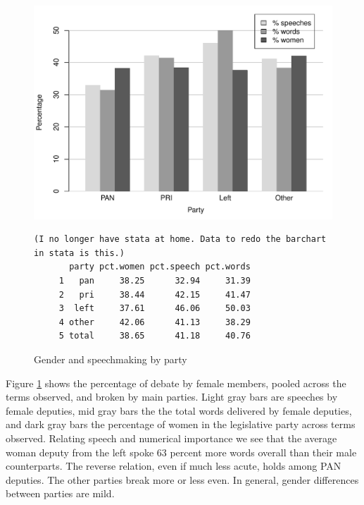 \documentclass[letter,12pt]{article}
\begin{document}
\begin{figure}
  \centering
    \includegraphics[width=.67\columnwidth]{../plots/women-bar.pdf}
\singlespacing
\begin{scriptsize}
\begin{verbatim}
(I no longer have stata at home. Data to redo the barchart in stata is this.)
       party pct.women pct.speech pct.words
     1   pan     38.25      32.94     31.39
     2   pri     38.44      42.15     41.47
     3  left     37.61      46.06     50.03
     4 other     42.06      41.13     38.29
     5 total     38.65      41.18     40.76
\end{verbatim}
\end{scriptsize}
\doublespacing
    \caption{Gender and speechmaking by party}\label{F:women}
\end{figure}

Figure \ref{F:women} shows the percentage of debate by female members, pooled across the terms observed, and broken by main parties. Light gray bars are speeches by female deputies, mid gray bars the the total words delivered by female deputies, and dark gray bars the percentage of women in the legislative party across terms observed. Relating speech and numerical importance we see that the average woman deputy from the left spoke 63 percent more words overall than their male counterparts. The reverse relation, even if much less acute, holds among PAN deputies. The other parties break more or less even. In general, gender differences between parties are mild. 

\end{document}
